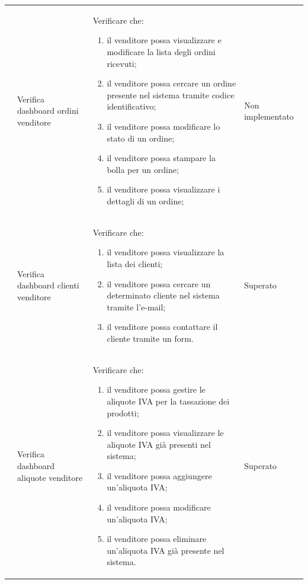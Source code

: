 \begin{center}
\begin{longtable}{|p{0.85cm}|p{2.25cm}|p{9cm}|p{3cm}|}
		 & Verifica dashboard ordini venditore & Verificare che:
		\begin{enumerate}
			\item il venditore possa visualizzare e modificare la lista degli ordini ricevuti;
			\item il venditore possa cercare un ordine presente nel sistema tramite codice identificativo;
			\item il venditore possa modificare lo stato di un ordine;
			\item il venditore possa stampare la bolla per un ordine;
			\item il venditore possa visualizzare i dettagli di un ordine;
		\end{enumerate} & Non implementato\\

		 & Verifica dashboard clienti venditore & Verificare che:
		\begin{enumerate}
			\item il venditore possa visualizzare la lista dei clienti;
			\item il venditore possa cercare un determinato cliente nel sistema tramite l'e-mail;
			\item il venditore possa contattare il cliente tramite un form.
		\end{enumerate} & Superato\\

		 & Verifica dashboard aliquote venditore & Verificare che:
		\begin{enumerate}
			\item il venditore possa gestire le aliquote IVA per la tassazione dei prodotti;
			\item il venditore possa visualizzare le aliquote IVA già presenti nel sistema;
			\item il venditore possa aggiungere un'aliquota IVA;
			\item il venditore possa modificare un'aliquota IVA;
			\item il venditore possa eliminare un'aliquota IVA già presente nel sistema.
		\end{enumerate}& Superato\\


\end{longtable}
\end{center}
